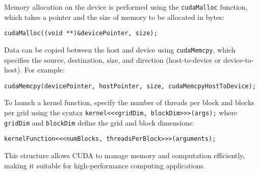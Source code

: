\documentclass[english, 12pt, a4paper, elec, utf8, a-2b, online]{aaltothesis}
\begin{document}
Memory allocation on the device is performed using the \texttt{cudaMalloc} function, which takes a pointer and the size of memory to be allocated in bytes:
\begin{verbatim}
cudaMalloc((void **)&devicePointer, size);
\end{verbatim}

Data can be copied between the host and device using \texttt{cudaMemcpy}, which specifies the source, destination, size, and direction (host-to-device or device-to-host). For example:
\begin{verbatim}
cudaMemcpy(devicePointer, hostPointer, size, cudaMemcpyHostToDevice);
\end{verbatim}

To launch a kernel function, specify the number of threads per block and blocks per grid using the syntax \texttt{kernel<<<gridDim, blockDim>>>(args);} where \texttt{gridDim} and \texttt{blockDim} define the grid and block dimensions:
\begin{verbatim}
kernelFunction<<<numBlocks, threadsPerBlock>>>(arguments);
\end{verbatim}

This structure allows CUDA to manage memory and computation efficiently, making it suitable for high-performance computing applications.


\clearpage

\end{document}
